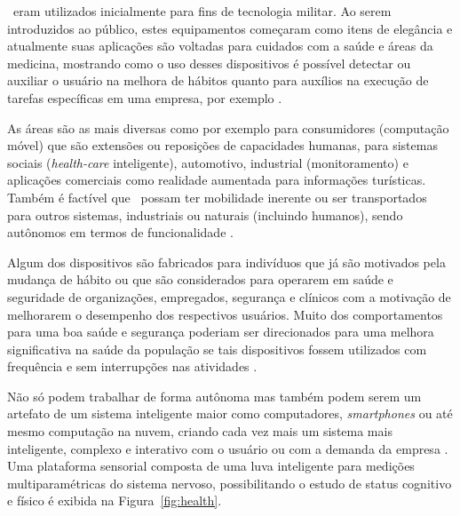        \Wearables\ eram utilizados inicialmente para fins de tecnologia militar.
        Ao serem introduzidos ao público, estes equipamentos começaram como itens de elegância e atualmente suas aplicações são voltadas para cuidados com a saúde e áreas da medicina, mostrando como o uso desses dispositivos é possível detectar ou auxiliar o usuário na melhora de hábitos quanto para auxílios na execução de tarefas específicas em uma empresa, por exemplo \citep{chan2012smart}.
        
        As áreas são as mais diversas como por exemplo para consumidores (computação móvel) que são extensões ou reposições de capacidades humanas, para sistemas sociais (\textit{health-care} inteligente), automotivo, industrial (monitoramento) e aplicações comerciais como realidade aumentada para informações turísticas.
        Também é factível que \wearables\ possam ter mobilidade inerente ou ser transportados para outros sistemas, industriais ou naturais (incluindo humanos), sendo autônomos em termos de funcionalidade \citep{Jozwiak2017}.
    
        Algum dos dispositivos são fabricados para indivíduos que já são motivados pela mudança de hábito ou que são considerados para operarem em saúde e seguridade de organizações, empregados, segurança e clínicos com a motivação de melhorarem o desempenho dos respectivos usuários.
        Muito dos comportamentos para uma boa saúde e segurança poderiam ser direcionados para uma melhora significativa na saúde da população se tais dispositivos fossem utilizados com frequência e sem interrupções nas atividades \citep{patel2015wearable}.
        
        
        Não só podem trabalhar de forma autônoma mas também podem serem um artefato de um sistema inteligente maior como computadores, \textit{smartphones} ou até mesmo computação na nuvem, criando cada vez mais um sistema mais inteligente, complexo e interativo com o usuário ou com a demanda da empresa \citep{Jozwiak2017}.
        Uma plataforma sensorial composta de uma luva inteligente para medições multiparamétricas do sistema nervoso, possibilitando o estudo de status cognitivo e físico é exibida na Figura~\ref{fig:health}.
        

